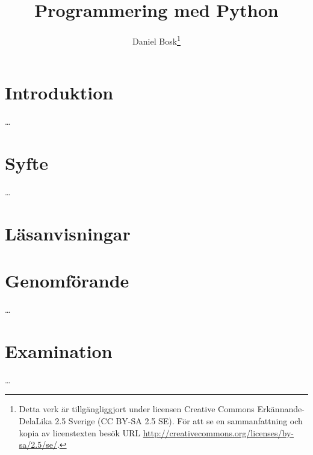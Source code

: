 \documentclass[a4paper]{miunasgn}
\title{Programmering med Python}
\author{
  Daniel Bosk\footnote{%
    Detta verk är tillgängliggjort under licensen Creative Commons 
    Erkännande-DelaLika 2.5 Sverige (CC BY-SA 2.5 SE).
    För att se en sammanfattning och kopia av licenstexten besök URL 
    \url{http://creativecommons.org/licenses/by-sa/2.5/se/}.
  }
}
\date{\svnId}
\begin{document}
\maketitle
\thispagestyle{foot}
\tableofcontents

\section{Introduktion}
\label{sec:intro}
\dots


\section{Syfte}
\label{sec:aim}
\dots
\begin{itemize}
  
\end{itemize}


\section{Läsanvisningar}
\label{sec:reading}



\section{Genomförande}
\label{sec:work}
\dots


\section{Examination}
\label{sec:exam}
\dots


\printbibliography
\end{document}
